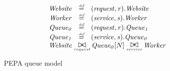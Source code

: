 \begin{figure}
	\caption{PEPA queue model}
	\centering
	\begin{displaymath}
	\begin{array}{rcl}
	\mathit{Website} & \rmdef & (\mathit{request},\mathit{r}).\mathit{Website}\\
	\mathit{Worker} & \rmdef & (\mathit{service},\mathit{s}).\mathit{Worker}\\
	\mathit{Queue_{0}} & \rmdef & (\mathit{request},\mathit{r}).\mathit{Queue_{1}}\\
	\mathit{Queue_{1}} & \rmdef & (\mathit{service},\mathit{s}).\mathit{Queue_{0}}\\
	[0.0ex]		\multicolumn{3}{l}{\mathit{Website}\sync{request}\mathit{Queue_{0}}[N]\sync{service}\mathit{Worker}}\\
	[0.0ex]	\end{array}
	\end{displaymath}
\end{figure}
